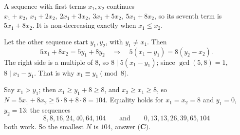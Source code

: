 A sequence with first terms $x_1,x_2$ continues $x_1+x_2,\ x_1+2x_2,\ 2x_1+3x_2,\ 3x_1+5x_2,\ 5x_1+8x_2$, so its seventh term is $5x_1+8x_2$. It is non-decreasing exactly when $x_1\le x_2$.

Let the other sequence start $y_1,y_2$, with $y_1\ne x_1$. Then
\[
5x_1+8x_2=5y_1+8y_2\quad\Longrightarrow\quad 5(x_1-y_1)=8(y_2-x_2).
\]
The right side is a multiple of $8$, so $8\mid5(x_1-y_1)$; since $\gcd(5,8)=1$, $8\mid x_1-y_1$. That is why $x_1\equiv y_1\pmod8$.

Say $x_1>y_1$; then $x_1\ge y_1+8\ge8$, and $x_2\ge x_1\ge8$, so $N=5x_1+8x_2\ge5\cdot8+8\cdot8=104$. Equality holds for $x_1=x_2=8$ and $y_1=0$, $y_2=13$: the sequences
\[
8,8,16,24,40,64,104\qquad\text{and}\qquad 0,13,13,26,39,65,104
\]
both work. So the smallest $N$ is $\boxed{104}$, answer $\textbf{(C)}$.
